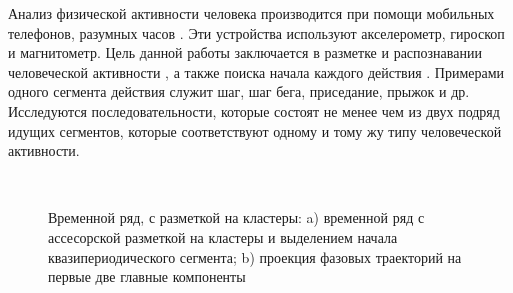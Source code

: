 Анализ физической активности человека производится при помощи мобильных телефонов, разумных часов \cite{kwapisz2010, wang2014}. 
Эти устройства используют акселерометр, гироскоп и магнитометр. 
Цель данной работы заключается в  разметке и распознавании человеческой активности \cite{Ignatov2015, Olivares2012, cinar2018}, а также поиска начала каждого действия \cite{motrenko2015}. 
Примерами одного сегмента действия служит шаг, шаг бега, приседание, прыжок и др. 
Исследуются последовательности, которые состоят не менее чем из двух подряд идущих сегментов, которые соответствуют одному и тому жу типу человеческой активности.

\begin{figure}[h!t]\center
{}
\\
\caption{Временной ряд, с разметкой на кластеры: a) временной ряд с ассесорской разметкой на кластеры и выделением начала квазипериодического сегмента; b) проекция фазовых траекторий на первые две главные компоненты }
\end{figure}

